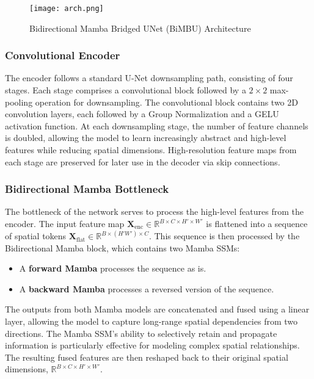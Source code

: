 \begin{figure*}
    \centering
    \texttt{[image: arch.png]}
    \caption{Bidirectional Mamba Bridged UNet (BiMBU) Architecture}
    \label{fig:bimbu}
\end{figure*}

\subsubsection{Convolutional Encoder}
The encoder follows a standard U-Net downsampling path, consisting of four stages. Each stage comprises a convolutional block followed by a $2 \times 2$ max-pooling operation for downsampling. The convolutional block contains two 2D convolution layers, each followed by a Group Normalization and a GELU activation function. At each downsampling stage, the number of feature channels is doubled, allowing the model to learn increasingly abstract and high-level features while reducing spatial dimensions. High-resolution feature maps from each stage are preserved for later use in the decoder via skip connections.

\subsubsection{Bidirectional Mamba Bottleneck}
The bottleneck of the network serves to process the high-level features from the encoder. The input feature map $\mathbf{X}_{\text{enc}} \in \mathbb{R}^{B \times C \times H' \times W'}$ is flattened into a sequence of spatial tokens $\mathbf{X}_{\text{flat}} \in \mathbb{R}^{B \times (H'W') \times C}$. This sequence is then processed by the Bidirectional Mamba block, which contains two Mamba SSMs:
\begin{itemize}
    \item A \textbf{forward Mamba} processes the sequence as is.
    \item A \textbf{backward Mamba} processes a reversed version of the sequence.
\end{itemize}
The outputs from both Mamba models are concatenated and fused using a linear layer, allowing the model to capture long-range spatial dependencies from two directions. The Mamba SSM's ability to selectively retain and propagate information is particularly effective for modeling complex spatial relationships. The resulting fused features are then reshaped back to their original spatial dimensions, $\mathbb{R}^{B \times C \times H' \times W'}$.

